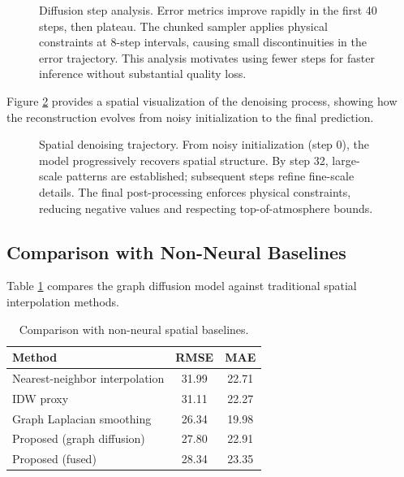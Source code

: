 \documentclass[preprint,12pt]{elsarticle}
\begin{document}
\begin{figure}[htbp]
\centering
{}
\caption{Diffusion step analysis. Error metrics improve rapidly in the first 40 steps, then plateau. The chunked sampler applies physical constraints at 8-step intervals, causing small discontinuities in the error trajectory. This analysis motivates using fewer steps for faster inference without substantial quality loss.}
\label{fig:diffusion_steps}
\end{figure}

Figure \ref{fig:diffusion_evolution} provides a spatial visualization of the denoising process, showing how the reconstruction evolves from noisy initialization to the final prediction.

\begin{figure}[htbp]
\centering
{}
\caption{Spatial denoising trajectory. From noisy initialization (step 0), the model progressively recovers spatial structure. By step 32, large-scale patterns are established; subsequent steps refine fine-scale details. The final post-processing enforces physical constraints, reducing negative values and respecting top-of-atmosphere bounds.}
\label{fig:diffusion_evolution}
\end{figure}

\subsection{Comparison with Non-Neural Baselines}

Table \ref{tab:spatial_baselines} compares the graph diffusion model against traditional spatial interpolation methods.

\begin{table}[htbp]
\centering
\caption{Comparison with non-neural spatial baselines.}
\label{tab:spatial_baselines}
\begin{tabular}{lcc}
\toprule
Method & RMSE & MAE \\
\midrule
Nearest-neighbor interpolation & 31.99 & 22.71 \\
IDW proxy & 31.11 & 22.27 \\
Graph Laplacian smoothing & 26.34 & 19.98 \\
\midrule
Proposed (graph diffusion) & 27.80 & 22.91 \\
Proposed (fused) & 28.34 & 23.35 \\
\bottomrule
\end{tabular}
\end{table}
\end{document}
